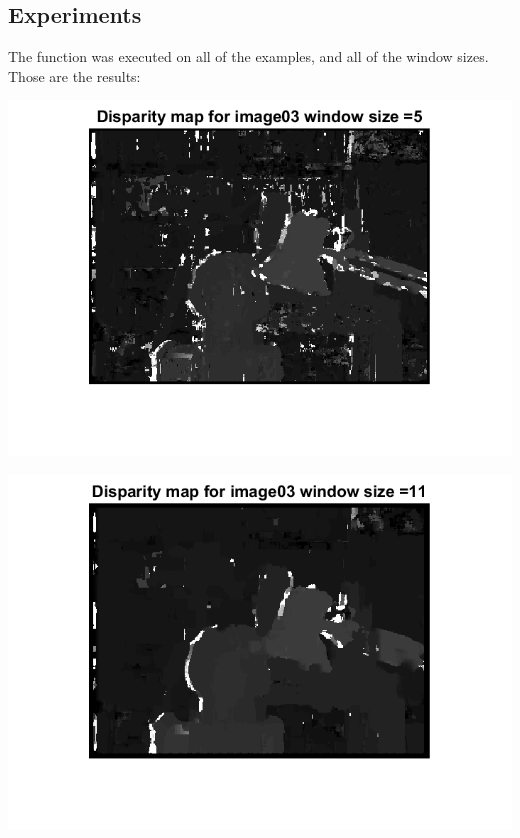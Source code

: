 \documentclass[a4paper]{iacas}
\begin{document}
\subsection{Experiments}
The function was executed on all of the examples, and all of the window sizes. Those are the results:



\vskip 0.1in
\begin{minipage}{\linewidth}
	\includegraphics[scale=1]{results/04_16_06/disp_map_03_template_1.png}
	\label{fig_4}
\end{minipage}
\vskip 0.1in
\begin{minipage}{\linewidth}
	\includegraphics[scale=1]{results/04_16_06/disp_map_03_template_2.png}
	\label{fig_4}
\end{minipage}
\end{document}
